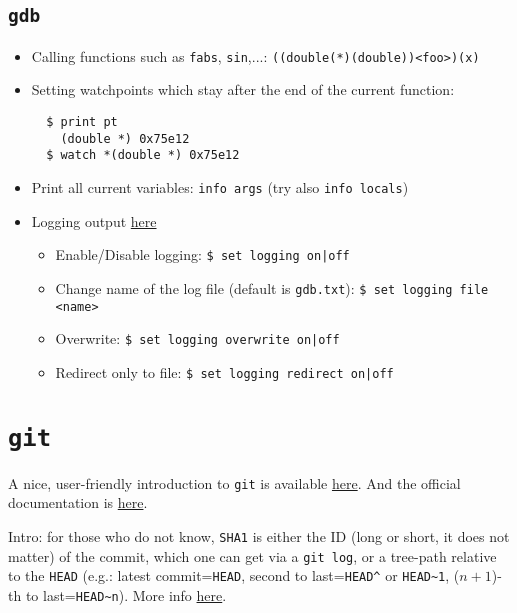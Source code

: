 \documentclass[a4paper,12pt,%
              final%
              ]{article}
\begin{document}
\subsection{\texttt{gdb}}
\label{sec:gdb}
\begin{itemize}
  \item Calling functions such as \texttt{fabs}, \texttt{sin},...: \texttt{((double(*)(double))<foo>)(x)}
  \item Setting watchpoints which stay after the end of the current function:
\begin{verbatim}
  $ print pt
    (double *) 0x75e12
  $ watch *(double *) 0x75e12
\end{verbatim}
  \item Print all current variables: \texttt{info args} (try also \texttt{info locals})
  \item Logging output \href{https://sourceware.org/gdb/onlinedocs/gdb/Logging-Output.html}{here}
    \begin{itemize}
      \item Enable/Disable logging: \verb!$ set logging on|off!
      \item Change name of the log file (default is \texttt{gdb.txt}): \verb|$ set logging file <name>|
      \item Overwrite: \verb!$ set logging overwrite on|off!
      \item Redirect only to file: \verb!$ set logging redirect on|off!
    \end{itemize}
\end{itemize}

\section{\texttt{git}}
\label{sec:git}
A nice, user-friendly introduction to \texttt{git} is available \href{https://www.atlassian.com/git/tutorials/learn-git-with-bitbucket-cloud}{here}. And the official documentation is \href{https://git-scm.com/doc}{here}.

Intro: for those who do not know, \texttt{SHA1} is either the ID (long or short, it does not matter) of the commit, which one can get via a \texttt{git log}, or a tree-path relative to the \texttt{HEAD} (e.g.: latest commit=\texttt{HEAD}, second to last=\verb|HEAD^| or \verb|HEAD~1|, ($n+1$)-th to last=\verb|HEAD~n|). More info \href{https://git-scm.com/docs/git-cherry-pick}{here}.
\end{document}
